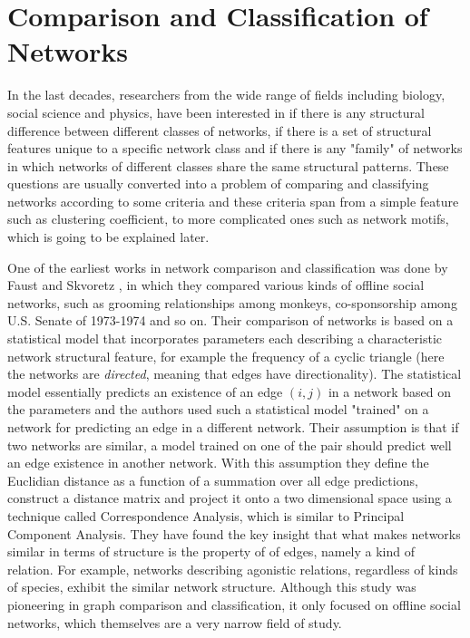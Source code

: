 	\section{Comparison and Classification of Networks}
	 In the last decades, researchers from the wide range of fields including biology, social science and physics, have been interested in if there is any structural difference between different classes of networks, if there is a set of structural features unique to a specific network class and if there is any "family" of networks in which networks of different classes share the same structural patterns. These questions are usually converted into a problem of comparing and classifying networks according to some criteria and these criteria span from a simple feature such as clustering coefficient, to more complicated ones such as network motifs, which is going to be explained later.
	
	One of the earliest works in network comparison and classification was done by Faust and Skvoretz \cite{Faust.Skvoretz2002Comparing}, in which they compared various kinds of offline social networks, such as grooming relationships among monkeys, co-sponsorship among U.S. Senate of 1973-1974 and so on. Their comparison of networks is based on a statistical model that incorporates parameters each describing a characteristic network structural feature, for example the frequency of a cyclic triangle (here the networks are \textit{directed}, meaning that edges have directionality). The statistical model essentially predicts an existence of an edge $(i,j)$ in a network based on the parameters and the authors used such a statistical model "trained" on a network for predicting an edge in a different network. Their assumption is that if two networks are similar, a model trained on one of the pair should predict well an edge existence in another network. With this assumption they define the Euclidian distance as a function of a summation over all edge predictions, construct a distance matrix and project it onto a two dimensional space using a technique called Correspondence Analysis, which is similar to Principal Component Analysis. They have found the key insight that what makes networks similar in terms of structure is the property of of edges, namely a kind of relation. For example, networks describing agonistic relations, regardless of kinds of species, exhibit the similar network structure. Although this study was pioneering in graph comparison and classification, it only focused on offline social networks, which themselves are a very narrow field of study.
	

